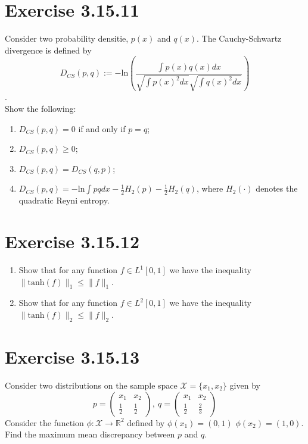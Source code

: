 \documentclass{exam}
\begin{document}
\section*{Exercise 3.15.11}
Consider two probability densitie, $p(x)$ and $q(x)$. The Cauchy-Schwartz divergence is defined by 
\begin{equation*}
    D_{CS}(p,q) := -\text{ln}(\displaystyle\frac{\int p(x) q(x) d x}{\sqrt{\int p(x)^2 d x } \sqrt{\int q(x)^2 d x }})
\end{equation*}.\\
Show the following: 
\begin{enumerate}
    \item $D_{CS}(p,q) = 0$ if and only if $p = q$;
    \item $D_{CS}(p,q) \geq 0$;
    \item $D_{CS}(p,q) = D_{CS}(q,p)$;
    \item $D_{CS}(p,q) = \displaystyle-\text{ln}\int pq d x  - \frac{1}{2}H_2(p) - \frac{1}{2}H_2(q)$, where $H_2(\cdot)$ denotes the quadratic Reyni entropy.
\end{enumerate}

\section*{Exercise 3.15.12}
\begin{enumerate}
    \item Show that for any function $f \in L^{1}[0,1]$ we have the inequality $\lVert \text{tanh}(f) \rVert_{1} \leq \lVert f \rVert_{1}$.
    \item Show that for any function $f \in L^{2} [0,1]$ we have the inequality $\lVert \text{tanh}(f) \rVert_{2} \leq \lVert f \rVert_{2}$.
\end{enumerate}

\section*{Exercise 3.15.13}
Consider two distributions on the sample space $\mathcal{X} = \{ x_1, x_2\}$ given by 
\begin{equation*}
    p = \begin{pmatrix}
        x_1 & x_2 \\
        \frac{1}{2} & \frac{1}{2}
        \end{pmatrix}, \ q = \begin{pmatrix}
            x_1 & x_2\\
            \frac{1}{2} & \frac{2}{3}
            \end{pmatrix}
\end{equation*}
Consider the function $\phi: \mathcal{X} \to \mathbb{R}^2$ defined by $\phi(x_1) = (0,1)$ $\phi(x_2) = (1,0)$. Find the maximum mean discrepancy between $p$ and $q$.
\end{document}
